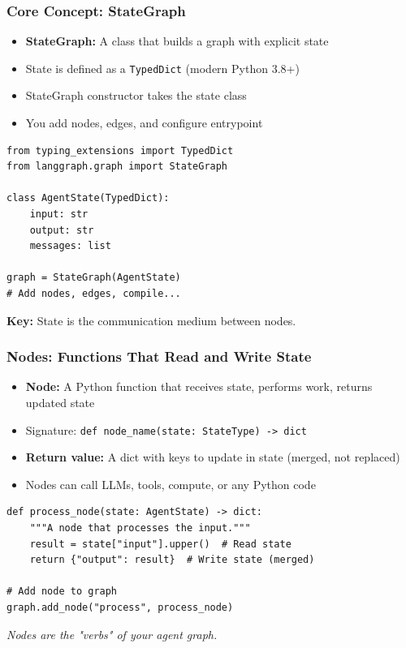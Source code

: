 \documentclass[aspectratio=169,11pt]{beamer}
\begin{document}
\begin{frame}[fragile]
\frametitle{Core Concept: StateGraph}
\begin{itemize}
    \setlength{\itemsep}{1pt}
  \item \textbf{StateGraph:} A class that builds a graph with explicit state
  \item State is defined as a \texttt{TypedDict} (modern Python 3.8+)
  \item StateGraph constructor takes the state class
  \item You add nodes, edges, and configure entrypoint
\end{itemize}

\vspace{10pt}
\begin{lstlisting}
from typing_extensions import TypedDict
from langgraph.graph import StateGraph

class AgentState(TypedDict):
    input: str
    output: str
    messages: list

graph = StateGraph(AgentState)
# Add nodes, edges, compile...
\end{lstlisting}

\vspace{10pt}
\textbf{Key:} State is the communication medium between nodes.
\end{frame}

\begin{frame}[fragile]
\frametitle{Nodes: Functions That Read and Write State}
\begin{itemize}
    \setlength{\itemsep}{1pt}
  \item \textbf{Node:} A Python function that receives state, performs work, returns updated state
  \item Signature: \texttt{def node\_name(state: StateType) -> dict}
  \item \textbf{Return value:} A dict with keys to update in state (merged, not replaced)
  \item Nodes can call LLMs, tools, compute, or any Python code
\end{itemize}

\vspace{10pt}
\begin{lstlisting}
def process_node(state: AgentState) -> dict:
    """A node that processes the input."""
    result = state["input"].upper()  # Read state
    return {"output": result}  # Write state (merged)

# Add node to graph
graph.add_node("process", process_node)
\end{lstlisting}

\vspace{10pt}
\textit{Nodes are the "verbs" of your agent graph.}
\end{frame}
\end{document}
